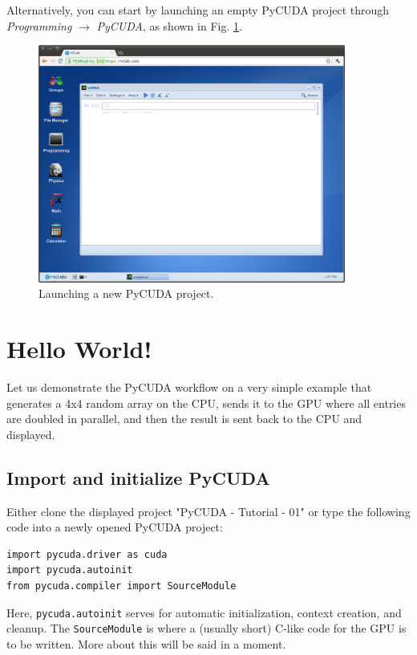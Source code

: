 \documentclass[article,A4,12pt]{llncs}
\begin{document}
Alternatively, you can start by launching an empty PyCUDA project through 
{\em Programming} $\rightarrow$ {\em PyCUDA}, as shown in Fig. \ref{fig:pycuda}.


\begin{figure}[!ht]
\begin{center}
\includegraphics[width=0.9\textwidth]{img/pycuda.png}
\end{center}
\caption{Launching a new PyCUDA project.}
\label{fig:pycuda}
\end{figure}
\noindent


\section{Hello World!}\label{sec:hello}

Let us demonstrate the PyCUDA workflow on a very simple example that 
generates a 4x4 random array on the CPU, sends it to the GPU where 
all entries are doubled in parallel, and then the result is sent 
back to the CPU and displayed. 

\subsection{Import and initialize PyCUDA}

Either clone the displayed project "PyCUDA - Tutorial - 01" or type the following 
code into a newly opened PyCUDA project:
\begin{verbatim}
import pycuda.driver as cuda
import pycuda.autoinit
from pycuda.compiler import SourceModule
\end{verbatim}
Here, {\tt pycuda.autoinit} serves for automatic initialization, context creation, 
and cleanup. The {\tt SourceModule} is where a (usually short) C-like code for the 
GPU is to be written. More about this will be said in a moment. 
\end{document}
